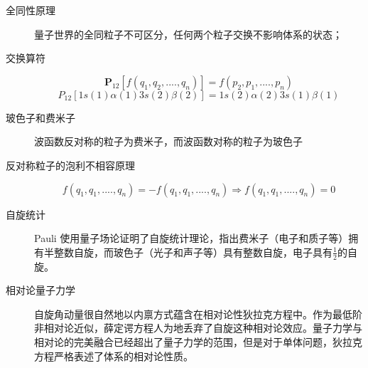 \documentclass[12pt,a4paper,openany,twoside]{book}
\numberwithin{equation}{section}
\begin{document}
        \begin{description}
          \item[全同性原理] 量子世界的全同粒子不可区分，任何两个粒子交换不影响体系的状态；

          \item[交换算符]
            \begin{equation}
              \textbf{P}_{12}[f(q_1,q_2,....,q_n)]=f(p_2,p_1,....,p_n)
            \end{equation}
            \begin{equation}
              P_{12}[1s(1)\alpha(1)3s(2)\beta(2)]=1s(2)\alpha(2)3s(1)\beta(1)
            \end{equation}

          \item[玻色子和费米子] 波函数反对称的粒子为费米子，而波函数对称的粒子为玻色子

          \item[反对称粒子的泡利不相容原理]
            \begin{equation}
              f(q_1,q_1,....,q_n)=-f(q_1,q_1,....,q_n) \Rightarrow f(q_1,q_1,....,q_n)=0
            \end{equation}

          \item[自旋统计] Pauli 使用量子场论证明了自旋统计理论，指出费米子（电子和质子等）拥有半整数自旋，而玻色子（光子和声子等）具有整数自旋，电子具有$\frac{1}{2}$的自旋。

          \item[相对论量子力学] 自旋角动量很自然地以内禀方式蕴含在相对论性狄拉克方程中。作为最低阶非相对论近似，薛定谔方程人为地丢弃了自旋这种相对论效应。量子力学与相对论的完美融合已经超出了量子力学的范围，但是对于单体问题，狄拉克方程严格表述了体系的相对论性质。
        \end{description}
\end{document}
